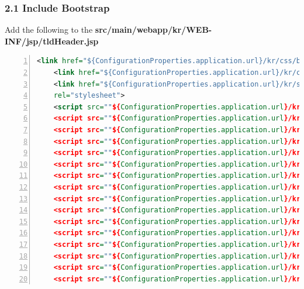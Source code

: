 \subsubsection*{2.1 Include Bootstrap}
Add the following to the \textbf{src/main/webapp/kr/WEB-INF/jsp/tldHeader.jsp}
\begin{lstlisting}[basicstyle=\scriptsize,numbers=left,language=xml,backgroundcolor=\color{ubergray},caption={web/src/main/webapp/WEB-INF/tags/rice-portal/trainingTab.tag},frame=single,breaklines=true]
  <link href="${ConfigurationProperties.application.url}/kr/css/bootstrap.css" rel="stylesheet">
    <link href="${ConfigurationProperties.application.url}/kr/css/bootstrap-responsive.css" rel="stylesheet">
    <link href="${ConfigurationProperties.application.url}/kr/scripts/google-code-prettify/prettify.css"
    rel="stylesheet">
    <script src=""${ConfigurationProperties.application.url}/kr/scripts/jquery.js"></script>
    <script src=""${ConfigurationProperties.application.url}/kr/scripts/google-code-prettify/prettify.js"></script>
    <script src=""${ConfigurationProperties.application.url}/kr/scripts/bootstrap-transition.js"></script>
    <script src=""${ConfigurationProperties.application.url}/kr/scripts/bootstrap-alert.js"></script>
    <script src=""${ConfigurationProperties.application.url}/kr/scripts/bootstrap-modal.js"></script>
    <script src=""${ConfigurationProperties.application.url}/kr/scripts/bootstrap-dropdown.js"></script>
    <script src=""${ConfigurationProperties.application.url}/kr/scripts/bootstrap-scrollspy.js"></script>
    <script src=""${ConfigurationProperties.application.url}/kr/scripts/bootstrap-tab.js"></script>
    <script src=""${ConfigurationProperties.application.url}/kr/scripts/bootstrap-tooltip.js"></script>
    <script src=""${ConfigurationProperties.application.url}/kr/scripts/bootstrap-popover.js"></script>
    <script src=""${ConfigurationProperties.application.url}/kr/scripts/bootstrap-button.js"></script>
    <script src=""${ConfigurationProperties.application.url}/kr/scripts/bootstrap-collapse.js"></script>
    <script src=""${ConfigurationProperties.application.url}/kr/scripts/bootstrap-carousel.js"></script>
    <script src=""${ConfigurationProperties.application.url}/kr/scripts/bootstrap-typeahead.js"></script>
    <script src=""${ConfigurationProperties.application.url}/kr/scripts/bootstrap-affix.js"></script>
    <script src=""${ConfigurationProperties.application.url}/kr/scripts/application.js"></script>
\end{lstlisting}

